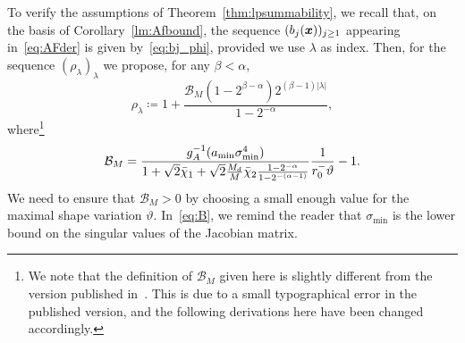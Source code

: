 To verify the assumptions of Theorem~\ref{thm:lpsummability}, we recall that, on the basis of Corollary~\ref{lm:Afbound}, the sequence $(b_j({{\bm{x}}}))_{j\geq 1}$ appearing in~\eqref{eq:AFder} is given by~\eqref{eq:bj_phi}, provided we use $\lambda$ as index.
Then, for the sequence $(\rho_{\lambda})_{\lambda}$ we propose, for any $\beta < \alpha$,
\begin{equation}
    \rho_\lambda \coloneqq 1 + \frac{\mathcal{B}_M(1-2^{\beta - \alpha})2^{(\beta - 1)|\lambda|}}{1-2^{-\alpha}},   \label{eq:rhoprop}
\end{equation}
where\footnote{We note that the definition of $\mathcal{B}_{M}$ given here is slightly different from the version published in~\cite{vanharten2024}. This is due to a small typographical error in the published version, and the following derivations here have been changed accordingly.}
\begin{align}
    \mathcal{B}_M = \frac{g_A^{-1}(a_{\min}\sigma_{\min}^4)}{1 + \sqrt{2}\bar{\chi}_1 + \sqrt{2}\frac{M_d}{M}\bar{\chi}_2\frac{1-2^{-\alpha}}{1-2^{-(\alpha-1)}}} \frac{1}{r_0^- \vartheta}  - 1. \label{eq:B}
\end{align}
We need to ensure that $\mathcal{B}_M>0$ by choosing a small enough value for the maximal shape variation $\vartheta$.
In~\eqref{eq:B}, we remind the reader that $\sigma_{\min}$ is the lower bound on the singular values of the Jacobian matrix.

